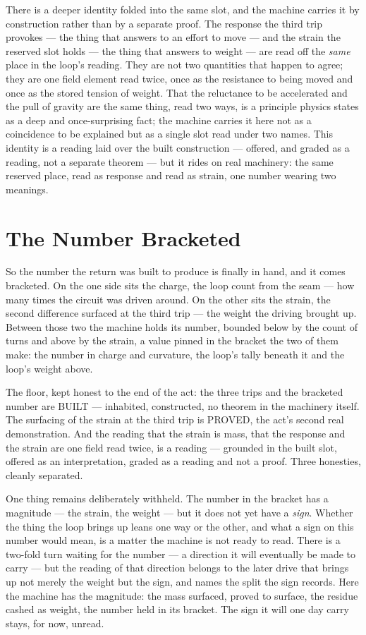 There is a deeper identity folded into the same slot, and the machine carries it by construction rather than by a
separate proof. The response the third trip provokes --- the thing that answers to an effort to move --- and the
strain the reserved slot holds --- the thing that answers to weight --- are read off the \emph{same} place in the
loop's reading. They are not two quantities that happen to agree; they are one field element read twice, once as
the resistance to being moved and once as the stored tension of weight. That the reluctance to be accelerated and
the pull of gravity are the same thing, read two ways, is a principle physics states as a deep and once-surprising
fact; the machine carries it here not as a coincidence to be explained but as a single slot read under two names.
This identity is a reading laid over the built construction --- offered, and graded as a reading, not a separate
theorem --- but it rides on real machinery: the same reserved place, read as response and read as strain, one
number wearing two meanings.

\section{The Number Bracketed}

So the number the return was built to produce is finally in hand, and it comes bracketed. On the one side sits the
charge, the loop count from the seam --- how many times the circuit was driven around. On the other sits the
strain, the second difference surfaced at the third trip --- the weight the driving brought up. Between those two
the machine holds its number, bounded below by the count of turns and above by the strain, a value pinned in the
bracket the two of them make: the number in charge and curvature, the loop's tally beneath it and the loop's
weight above.

The floor, kept honest to the end of the act: the three trips and the bracketed number are BUILT --- inhabited,
constructed, no theorem in the machinery itself. The surfacing of the strain at the third trip is PROVED, the
act's second real demonstration. And the reading that the strain is mass, that the response and the strain are one
field read twice, is a reading --- grounded in the built slot, offered as an interpretation, graded as a reading
and not a proof. Three honesties, cleanly separated.

One thing remains deliberately withheld. The number in the bracket has a
magnitude --- the strain, the weight --- but it does not yet have a \emph{sign}. Whether the thing the loop brings
up leans one way or the other, and what a sign on this number would mean, is a matter the machine is not ready to
read. There is a two-fold turn waiting for the number --- a direction it will eventually be made to carry --- but
the reading of that direction belongs to the later drive that brings up not merely the weight but the sign, and
names the split the sign records. Here the machine has the magnitude: the mass surfaced, proved to surface, the
residue cashed as weight, the number held in its bracket. The sign it will one day carry stays, for now, unread.
